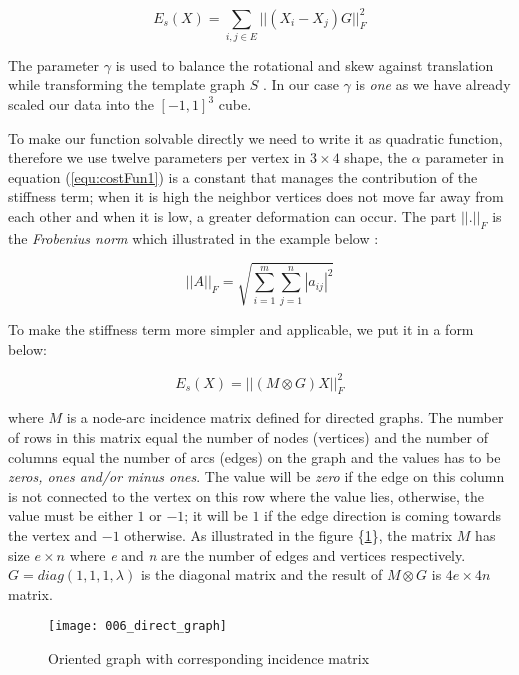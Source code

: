 \documentclass[../structure.tex]{subfiles}
\begin{document}
\begin{equation}
E_{s}(X) = \sum_{i,j \in E} ||(X_{i} - X_{j})G||_{F}^2
\label{equ:stiffness1}
\end{equation}

The parameter $\gamma$ is used to balance the rotational and skew  against translation while transforming the template graph $S$ \cite{Amberg2007}. In our case $\gamma$ is \textit{one} as we have already scaled our data into the $[-1, 1]^3$ cube.

To make our function solvable directly we need to write it as quadratic function, therefore we use twelve parameters per vertex in $3 \times 4$ shape, the $\alpha$ parameter in equation (\ref{equ:costFun1}) is a constant that manages the contribution of the stiffness term; when it is high the neighbor vertices does not move far away from each other and when it is low, a greater deformation can occur.
The part $||.||_{F}$ is the \textit{Frobenius norm} which illustrated in the example below \cite{Amberg2007}: 

\begin{equation*}
||A||_{F} = \sqrt{\sum_{i=1}^m \sum_{j=1}^n |a_{ij}|^2}
\end{equation*}

To make the stiffness term more simpler and applicable, we put it in a form below:

\begin{equation}
E_{s}(X) = ||(M\otimes G)X||_{F}^2
\end{equation}

where $M$ is a node-arc incidence matrix defined for directed graphs. The number of rows in this matrix equal the number of nodes (vertices) and the number of columns equal the number of arcs (edges) on the graph and the values has to be \textit{zeros, ones and/or minus ones}. The value will be \textit{zero} if the edge on this column is not connected to the vertex on this row where the value lies, otherwise, the value must be either $1$ or $-1$; it will be $1$ if the edge direction is coming towards the vertex and $-1$ otherwise. As illustrated in the figure \{\ref{fig:directed_graph}\}, the matrix $M$ has size $e\times n$ where \textit{e} and \textit{n} are the number of edges and vertices respectively. $G = diag(1,1,1,\lambda)$ is the diagonal matrix and the result of $M \otimes G$ is $4e \times 4n$ matrix.


\begin{figure}[h!]
\centering
\texttt{[image: 006\_direct\_graph]}
\captionsetup{justification=centering}
\caption{Oriented graph with corresponding incidence matrix  \cite{Wikipedia2010}}
\label{fig:directed_graph}
\end{figure}
\end{document}
